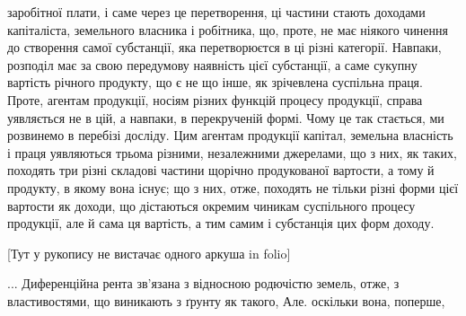 заробітної плати, і саме через це перетворення, ці частини стають доходами
капіталіста, земельного власника і робітника, що, проте, не має ніякого чинення
до створення самої субстанції, яка перетворюєтся в ці різні категорії. Навпаки,
розподіл має за свою передумову наявність цієї субстанції, а саме сукупну вартість
річного продукту, що є не що інше, як зрічевлена суспільна праця. Проте,
агентам продукції, носіям різних функцій процесу продукції, справа уявляється
не в цій, а навпаки, в перекрученій формі. Чому це так стається, ми розвинемо
в перебізі досліду. Цим агентам продукції капітал, земельна власність і
праця уявляються трьома різними, незалежними джерелами, що з них, як таких,
походять три різні складові частини щорічно продукованої вартости, а
тому й продукту, в якому вона існує; що з них, отже, походять не тільки різні
форми цієї вартости як доходи, що дістаються окремим чиникам суспільного процесу
продукції, але й сама ця вартість, а тим самим і субстанція цих форм
доходу.

[Тут у рукопису не вистачає одного аркуша in folio]

... Диференційна рента зв’язана з відносною родючістю земель, отже,
з властивостями, що виникають з ґрунту як такого, Але. оскільки вона, поперше,
